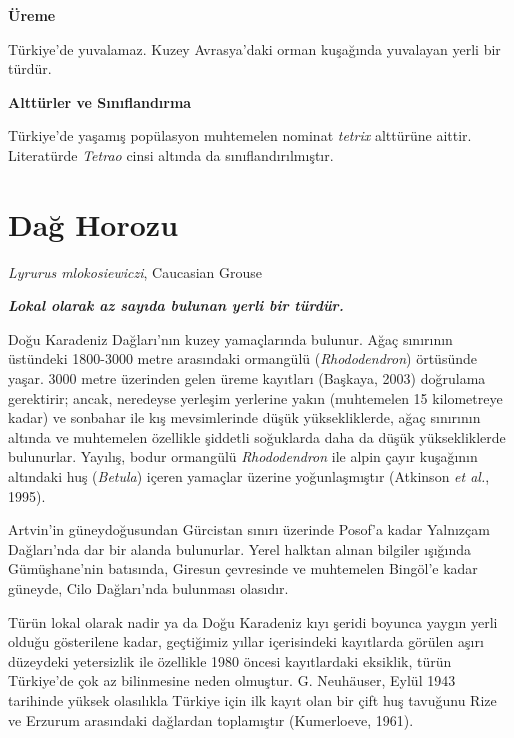 \documentclass[
  a4paper,
  DIV=11,
  numbers=noendperiod]{scrreprt}
\begin{document}
\textbf{Üreme}

Türkiye'de yuvalamaz. Kuzey Avrasya'daki orman kuşağında yuvalayan yerli
bir türdür.

\textbf{Alttürler ve Sınıflandırma}

Türkiye'de yaşamış popülasyon muhtemelen nominat \emph{tetrix} alttürüne
aittir. Literatürde \emph{Tetrao} cinsi altında da sınıflandırılmıştır.

\section{Dağ Horozu}\label{daux11f-horozu}

\emph{Lyrurus mlokosiewiczi}, Caucasian Grouse

\textbf{\emph{Lokal olarak az sayıda bulunan yerli bir türdür.}}

Doğu Karadeniz Dağları'nın kuzey yamaçlarında bulunur. Ağaç sınırının
üstündeki 1800-3000 metre arasındaki ormangülü (\emph{Rhododendron})
örtüsünde yaşar. 3000 metre üzerinden gelen üreme kayıtları (Başkaya,
2003) doğrulama gerektirir; ancak, neredeyse yerleşim yerlerine yakın
(muhtemelen 15 kilometreye kadar) ve sonbahar ile kış mevsimlerinde
düşük yüksekliklerde, ağaç sınırının altında ve muhtemelen özellikle
şiddetli soğuklarda daha da düşük yüksekliklerde bulunurlar. Yayılış,
bodur ormangülü \emph{Rhododendron} ile alpin çayır kuşağının altındaki
huş (\emph{Betula}) içeren yamaçlar üzerine yoğunlaşmıştır (Atkinson
\emph{et al.}, 1995).

Artvin'in güneydoğusundan Gürcistan sınırı üzerinde Posof'a kadar
Yalnızçam Dağları'nda dar bir alanda bulunurlar. Yerel halktan alınan
bilgiler ışığında Gümüşhane'nin batısında, Giresun çevresinde ve
muhtemelen Bingöl'e kadar güneyde, Cilo Dağları'nda bulunması olasıdır.

Türün lokal olarak nadir ya da Doğu Karadeniz kıyı şeridi boyunca yaygın
yerli olduğu gösterilene kadar, geçtiğimiz yıllar içerisindeki
kayıtlarda görülen aşırı düzeydeki yetersizlik ile özellikle 1980 öncesi
kayıtlardaki eksiklik, türün Türkiye'de çok az bilinmesine neden
olmuştur. G. Neuhäuser, Eylül 1943 tarihinde yüksek olasılıkla Türkiye
için ilk kayıt olan bir çift huş tavuğunu Rize ve Erzurum arasındaki
dağlardan toplamıştır (Kumerloeve, 1961).
\end{document}
